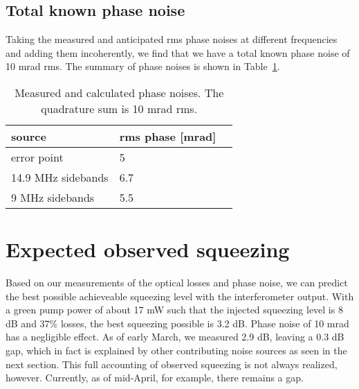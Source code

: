 \documentclass{ligodoc}
\begin{document}





\subsection{Total known phase noise}
Taking the measured and anticipated rms phase noises at different
frequencies and adding them incoherently, we find that we have a total
known phase noise of 10 mrad rms. The summary of phase noises is shown
in Table~\ref{tab:phasenoises}.

\begin{table}
\centering
\caption{Measured and calculated phase noises. The quadrature sum is 10 mrad rms.}
\begin{tabular}{l l l}
\hline
source & rms phase [mrad]\\
\hline
error point & 5 \\
14.9 MHz sidebands & 6.7 \\
9 MHz sidebands & 5.5 \\
\hline
\end{tabular}
\label{tab:phasenoises}
\end{table}



\section{Expected observed squeezing}
Based on our measurements of the optical losses and phase noise, we
can predict the best possible achieveable squeezing level with the
interferometer output. With a green pump power of about 17 mW such
that the injected squeezing level is 8 dB and 37\% losses, the best
squeezing possible is 3.2 dB. Phase noise of 10 mrad has a negligible
effect. As of early March, we measured 2.9 dB, leaving a 0.3 dB gap,
which in fact is explained by other contributing noise sources as seen
in the next section. This full accounting of observed squeezing is not
always realized, however. Currently, as of mid-April, for example,
there remains a gap.
\end{document}
